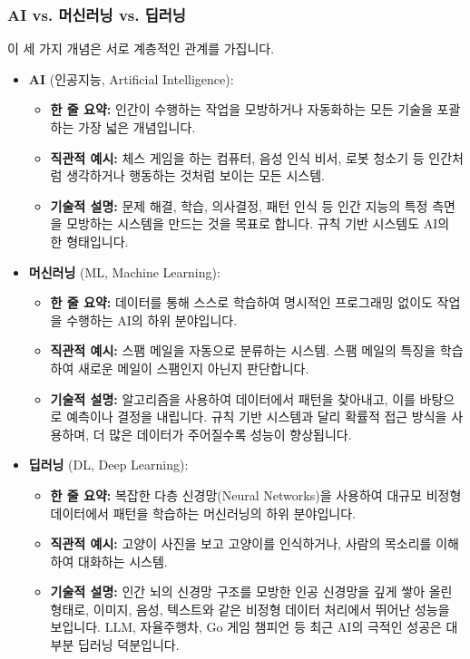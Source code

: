 \documentclass[11pt,a4paper]{article}
\theoremstyle{definition}
\begin{document}
\subsubsection*{AI vs. 머신러닝 vs. 딥러닝}
이 세 가지 개념은 서로 계층적인 관계를 가집니다.
\begin{itemize}
    \item \textbf{AI} (인공지능, Artificial Intelligence):
    \begin{itemize}
        \item \textbf{한 줄 요약:} 인간이 수행하는 작업을 모방하거나 자동화하는 모든 기술을 포괄하는 가장 넓은 개념입니다.
        \item \textbf{직관적 예시:} 체스 게임을 하는 컴퓨터, 음성 인식 비서, 로봇 청소기 등 인간처럼 생각하거나 행동하는 것처럼 보이는 모든 시스템.
        \item \textbf{기술적 설명:} 문제 해결, 학습, 의사결정, 패턴 인식 등 인간 지능의 특정 측면을 모방하는 시스템을 만드는 것을 목표로 합니다. 규칙 기반 시스템도 AI의 한 형태입니다.
    \end{itemize}
    \item \textbf{머신러닝} (ML, Machine Learning):
    \begin{itemize}
        \item \textbf{한 줄 요약:} 데이터를 통해 스스로 학습하여 명시적인 프로그래밍 없이도 작업을 수행하는 AI의 하위 분야입니다.
        \item \textbf{직관적 예시:} 스팸 메일을 자동으로 분류하는 시스템. 스팸 메일의 특징을 학습하여 새로운 메일이 스팸인지 아닌지 판단합니다.
        \item \textbf{기술적 설명:} 알고리즘을 사용하여 데이터에서 패턴을 찾아내고, 이를 바탕으로 예측이나 결정을 내립니다. 규칙 기반 시스템과 달리 확률적 접근 방식을 사용하며, 더 많은 데이터가 주어질수록 성능이 향상됩니다.
    \end{itemize}
    \item \textbf{딥러닝} (DL, Deep Learning):
    \begin{itemize}
        \item \textbf{한 줄 요약:} 복잡한 다층 신경망(Neural Networks)을 사용하여 대규모 비정형 데이터에서 패턴을 학습하는 머신러닝의 하위 분야입니다.
        \item \textbf{직관적 예시:} 고양이 사진을 보고 고양이를 인식하거나, 사람의 목소리를 이해하여 대화하는 시스템.
        \item \textbf{기술적 설명:} 인간 뇌의 신경망 구조를 모방한 인공 신경망을 깊게 쌓아 올린 형태로, 이미지, 음성, 텍스트와 같은 비정형 데이터 처리에서 뛰어난 성능을 보입니다. LLM, 자율주행차, Go 게임 챔피언 등 최근 AI의 극적인 성공은 대부분 딥러닝 덕분입니다.
    \end{itemize}
\end{itemize}
\end{document}
